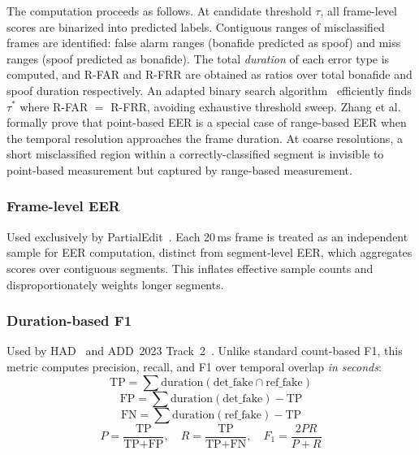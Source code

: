 \documentclass[journal]{IEEEtran}
\begin{document}
The computation proceeds as follows. At candidate threshold $\tau$, all frame-level scores are binarized into predicted labels. Contiguous ranges of misclassified frames are identified: false alarm ranges (bonafide predicted as spoof) and miss ranges (spoof predicted as bonafide). The total \emph{duration} of each error type is computed, and R-FAR and R-FRR are obtained as ratios over total bonafide and spoof duration respectively. An adapted binary search algorithm~\cite{zhang2023rangeeer} efficiently finds $\tau^*$ where R-FAR $=$ R-FRR, avoiding exhaustive threshold sweep. Zhang et al.~\cite{zhang2023rangeeer} formally prove that point-based EER is a special case of range-based EER when the temporal resolution approaches the frame duration. At coarse resolutions, a short misclassified region within a correctly-classified segment is invisible to point-based measurement but captured by range-based measurement.

\subsubsection{Frame-level EER}

Used exclusively by PartialEdit~\cite{zhang2025partialedit}. Each 20\,ms frame is treated as an independent sample for EER computation, distinct from segment-level EER, which aggregates scores over contiguous segments. This inflates effective sample counts and disproportionately weights longer segments.

\subsubsection{Duration-based F1}

Used by HAD~\cite{yi2021had} and ADD~2023 Track~2~\cite{yi2023add}. Unlike standard count-based F1, this metric computes precision, recall, and F1 over temporal overlap \emph{in seconds}:
\begin{equation}
\label{eq:dur_tp}
\text{TP} = \sum \text{duration}(\text{det\_fake} \cap \text{ref\_fake})
\end{equation}
\begin{equation}
\label{eq:dur_fp}
\text{FP} = \sum \text{duration}(\text{det\_fake}) - \text{TP}
\end{equation}
\begin{equation}
\label{eq:dur_fn}
\text{FN} = \sum \text{duration}(\text{ref\_fake}) - \text{TP}
\end{equation}
\begin{equation}
\label{eq:dur_f1}
P = \frac{\text{TP}}{\text{TP} + \text{FP}}, \quad R = \frac{\text{TP}}{\text{TP} + \text{FN}}, \quad F_1 = \frac{2PR}{P + R}
\end{equation}
\end{document}

